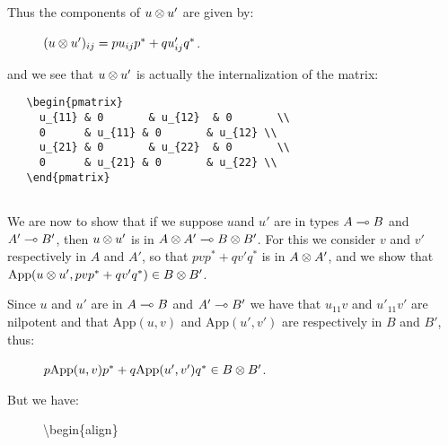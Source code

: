 Thus the components of \(u\otimes u'\) are given by:

\begin{description}
\item[]
\((u\otimes u')_{ij} = pu_{ij}p^* + qu'_{ij}q^*\).
\end{description}

and we see that \(u\otimes u'\) is actually the internalization of the
matrix:

\begin{description}
\item[]
\end{description}

\texttt{~~~\textbackslash{}begin\{pmatrix\}}\\
\texttt{~~~~~u\_\{11\}~\&~0~~~~~~~\&~u\_\{12\}~~\&~0~~~~~~~\textbackslash{}\textbackslash{}}\\
\texttt{~~~~~0~~~~~~\&~u\textquotesingle{}\_\{11\}~\&~0~~~~~~~\&~u\textquotesingle{}\_\{12\}~\textbackslash{}\textbackslash{}}\\
\texttt{~~~~~u\_\{21\}~\&~0~~~~~~~\&~u\_\{22\}~~\&~0~~~~~~~\textbackslash{}\textbackslash{}}\\
\texttt{~~~~~0~~~~~~\&~u\textquotesingle{}\_\{21\}~\&~0~~~~~~~\&~u\textquotesingle{}\_\{22\}~\textbackslash{}\textbackslash{}}\\
\texttt{~~~\textbackslash{}end\{pmatrix\}}\\
\texttt{~}

We are now to show that if we suppose \(u\)and \(u'\) are in types
\(A\multimap B\) and \(A'\multimap B'\), then \(u\otimes u'\) is in
\(A\otimes A'\multimap B\otimes B'\). For this we consider \(v\) and \(v'\)
respectively in \(A\) and \(A'\), so that \(pvp^* + qv'q^*\) is in
\(A\otimes A'\), and we show that
\(\mathrm{App}(u\otimes u', pvp^* + qv'q^*)\in B\otimes B'\).

Since \(u\) and \(u'\) are in \(A\multimap B\) and \(A'\multimap B'\) we have
that \(u_{11}v\) and \(u'_{11}v'\) are nilpotent and that
\(\mathrm{App}(u, v)\) and \(\mathrm{App}(u', v')\) are respectively in
\(B\) and \(B'\), thus:

\begin{description}
\item[]
\(p\mathrm{App}(u, v)p^* + q\mathrm{App}(u', v')q^* \in B\otimes B'\).
\end{description}

But we have:

\begin{description}
\item[]
\textbackslash{}begin\{align\}
\end{description}

